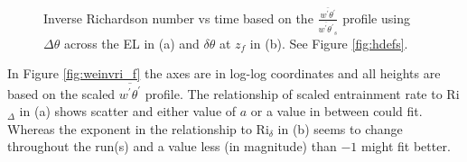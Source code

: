 \begin{figure}[htbp]
\begin{minipage}[b]{0.5\linewidth}
         
        \\
        \end{minipage}             
\quad
\begin{minipage}[b]{0.5\linewidth}
        \\
       
       \end{minipage}
        \caption[Richardson numbers based on $\frac{\overline{w^{'}\theta^{'}}}{\overline{w^{'}\theta^{'}}_{s}}$]{Inverse Richardson number vs time based on the $\frac{\overline{w^{'}\theta^{'}}}{\overline{w^{'}\theta^{'}}_{s}}$
profile using $\Delta \theta$ across the \acs{EL} in (a) and $\delta \theta$ at $z_{f}$ in (b).  See Figure \ref{fig:hdefs}.}
        \label{fig:invristime_f}
\end{figure}

In Figure \ref{fig:weinvri_f} the axes are in log-log coordinates and all heights are based on the scaled $\overline{w^{'}\theta^{'}}$ profile. The relationship of scaled entrainment rate to \acs{Ri}$_{\Delta}$ in (a) shows scatter and either value of $a$ or a value in between could fit.  Whereas the exponent in the relationship to \acs{Ri}$_{\delta}$ in (b) seems to change throughout the run(s) and a value less (in magnitude) than $-1$ might fit better. \\    

